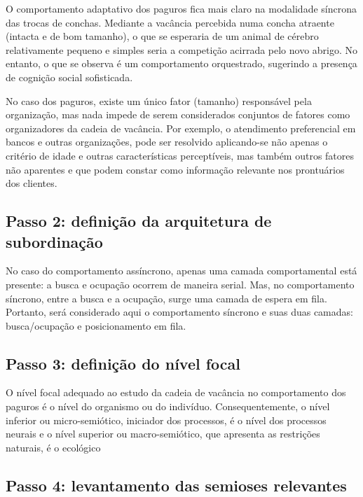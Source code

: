 O comportamento adaptativo dos paguros fica mais claro na modalidade síncrona das trocas de conchas. Mediante a vacância percebida numa concha atraente (intacta e de bom tamanho), o que se esperaria de um animal de cérebro relativamente pequeno e simples seria a competição acirrada pelo novo abrigo. No entanto, o que se observa é um comportamento orquestrado, sugerindo a presença de cognição social sofisticada.

No caso dos paguros, existe um único fator (tamanho) responsável pela organização, mas nada impede de serem considerados conjuntos de fatores como organizadores da cadeia de vacância. Por exemplo, o atendimento preferencial em bancos e outras organizações, pode ser resolvido aplicando-se não apenas o critério de idade e outras características perceptíveis, mas também outros fatores não aparentes e que podem constar como informação relevante nos prontuários dos clientes.

\subsection{Passo 2: definição da arquitetura de subordinação}

No caso do comportamento assíncrono, apenas uma camada comportamental está presente: a busca e ocupação ocorrem de maneira serial. Mas, no comportamento síncrono, entre a busca e a ocupação, surge uma camada de espera em fila. Portanto, será considerado aqui o comportamento síncrono e suas duas camadas: busca/ocupação e posicionamento em fila.


\subsection{Passo 3: definição do nível focal}

O nível focal adequado ao estudo da cadeia de vacância no comportamento dos paguros é o nível do organismo ou do indivíduo. Consequentemente, o nível inferior ou micro-semiótico, iniciador dos processos, é o nível dos processos neurais e o nível superior ou macro-semiótico, que apresenta as restrições naturais, é o ecológico %


\subsection{Passo 4: levantamento das semioses relevantes}


